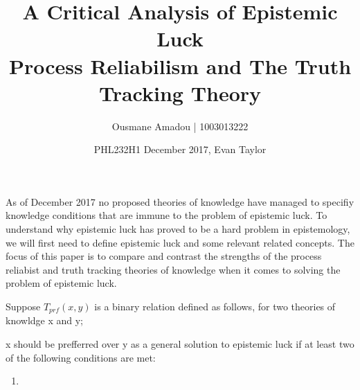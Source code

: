\documentclass{article}
\title{%
  A Critical Analysis of Epistemic Luck \\
  \large Process Reliabilism and The Truth Tracking Theory }
\author{Ousmane Amadou | 1003013222}
\date{PHL232H1 December 2017, Evan Taylor}
\begin{document}
\maketitle

As of December 2017 no proposed theories of knowledge have managed to specifiy knowledge conditions that are immune to the problem of epistemic luck. To understand why epistemic luck has proved to be a hard problem in epistemology, we will first need to define epistemic luck and some relevant related concepts. The focus of this paper is to compare and contrast the strengths of the process reliabist and truth tracking theories of knowledge when it comes to solving the problem of epistemic luck. 


Suppose $T_{prf}(x, y)$ is a binary relation defined as follows, for two theories of knowldge x and y;

x should be prefferred over y as a general solution to epistemic luck if at least two of the following conditions are met:

\begin{enumerate}
    \item 
\end{enumerate}
\end{document}
